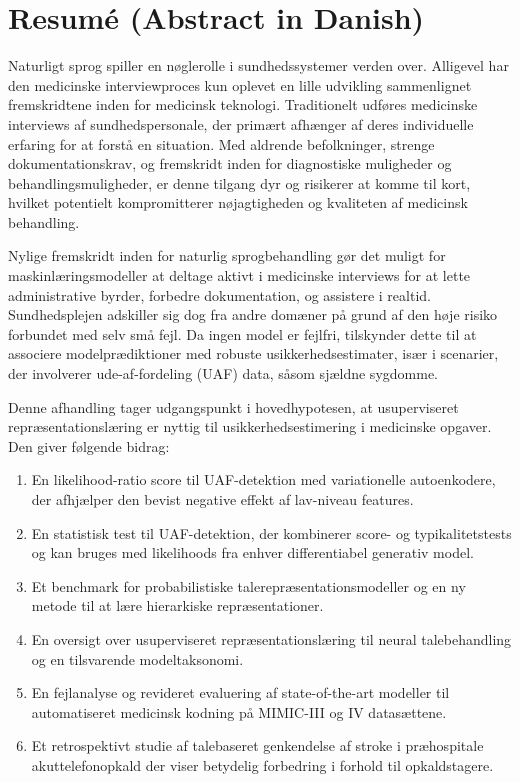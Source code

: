 
\chapter[resumé (abstract in danish)]{Resumé (Abstract in Danish)}

Naturligt sprog spiller en nøglerolle i sundhedssystemer verden over. Alligevel har den medicinske interviewproces kun oplevet en lille udvikling sammenlignet fremskridtene inden for medicinsk teknologi.
Traditionelt udføres medicinske interviews af sundhedspersonale, der primært afhænger af deres individuelle erfaring for at forstå en situation.
Med aldrende befolkninger, strenge dokumentationskrav, og fremskridt inden for diagnostiske muligheder og behandlingsmuligheder, er denne tilgang dyr og risikerer at komme til kort, hvilket potentielt kompromitterer nøjagtigheden og kvaliteten af medicinsk behandling.

Nylige fremskridt inden for naturlig sprogbehandling gør det muligt for maskinlæringsmodeller at deltage aktivt i medicinske interviews for at lette administrative byrder, forbedre dokumentation, og assistere i realtid.
Sundhedsplejen adskiller sig dog fra andre domæner på grund af den høje risiko forbundet med selv små fejl. Da ingen model er fejlfri, tilskynder dette til at associere modelprædiktioner med robuste usikkerhedsestimater, især i scenarier, der involverer ude-af-fordeling (UAF) data, såsom sjældne sygdomme.

Denne afhandling tager udgangspunkt i hovedhypotesen, at usuperviseret repræsentationslæring er nyttig til usikkerhedsestimering i medicinske opgaver.
Den giver følgende bidrag:
%
\begin{enumerate}[topsep=3pt, partopsep=0pt, itemsep=3pt, parsep=0pt, leftmargin=2em, label=(\alph*)] %
    \item En likelihood-ratio score til UAF-detektion med variationelle autoenkodere, der afhjælper den bevist negative effekt af lav-niveau features.
    \item En statistisk test til UAF-detektion, der kombinerer score- og typikalitetstests og kan bruges med likelihoods fra enhver differentiabel generativ model.
    \item Et benchmark for probabilistiske talerepræsentationsmodeller og en ny metode til at lære hierarkiske repræsentationer.
    \item En oversigt over usuperviseret repræsentationslæring til neural talebehandling og en tilsvarende modeltaksonomi.
    \item En fejlanalyse og revideret evaluering af state-of-the-art modeller til automatiseret medicinsk kodning på MIMIC-III og IV datasættene.
    \item Et retrospektivt studie af talebaseret genkendelse af stroke i præhospitale akuttelefonopkald der viser betydelig forbedring i forhold til opkaldstagere.
\end{enumerate}
%

